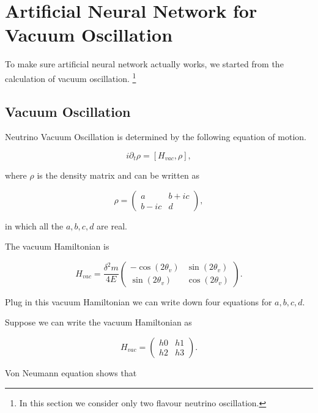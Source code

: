 \documentclass{tufte-handout}
\begin{document}
\section{Artificial Neural Network for Vacuum Oscillation}

To make sure artificial neural network actually works, we started from the calculation of vacuum oscillation. \footnote{In this section we consider only two flavour neutrino oscillation.}


\subsection{Vacuum Oscillation}


Neutrino Vacuum Oscillation is determined by the following equation of motion.

\begin{equation}
i\partial_t \rho = \left[ H_{vac},\rho \right],
\end{equation}

where $\rho$ is the density matrix and can be written as

\begin{equation}
\rho = \begin{pmatrix} a & b + i c\\
b - i c & d \end{pmatrix},
\end{equation}

in which all the $a,b,c,d$ are real.

The vacuum Hamiltonian is

\begin{equation}
H_{vac} = \frac{\delta^2 m}{4 E}\begin{pmatrix} -\cos(2\theta_v) & \sin(2\theta_v)\\
\sin(2\theta_v) & \cos(2\theta_v)\end{pmatrix}.
\end{equation}


Plug in this vacuum Hamiltonian we can write down four equations for $a,b,c,d$. 


Suppose we can write the vacuum Hamiltonian as

\begin{equation}
H_{vac} = \begin{pmatrix} h0 & h1 \\ h2 & h3 \end{pmatrix}.
\end{equation}

Von Neumann equation shows that
\end{document}
